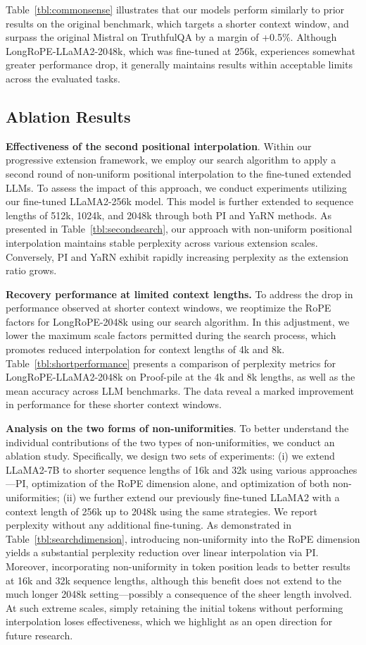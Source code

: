 Table~\ref{tbl:commonsense} illustrates that our models perform similarly to prior results on the original benchmark, which targets a shorter context window, and surpass the original Mistral on TruthfulQA by a margin of +0.5\%. Although LongRoPE-LLaMA2-2048k, which was fine-tuned at 256k, experiences somewhat greater performance drop, it generally maintains results within acceptable limits across the evaluated tasks.

\subsection{Ablation Results}

\textbf{Effectiveness of the second positional interpolation}. Within our progressive extension framework, we employ our search algorithm to apply a second round of non-uniform positional interpolation to the fine-tuned extended LLMs. To assess the impact of this approach, we conduct experiments utilizing our fine-tuned LLaMA2-256k model. This model is further extended to sequence lengths of 512k, 1024k, and 2048k through both PI and YaRN methods. As presented in Table~\ref{tbl:secondsearch}, our approach with non-uniform positional interpolation maintains stable perplexity across various extension scales. Conversely, PI and YaRN exhibit rapidly increasing perplexity as the extension ratio grows.

\textbf{Recovery performance at limited context lengths.} To address the drop in performance observed at shorter context windows, we reoptimize the RoPE factors for LongRoPE-2048k using our search algorithm. In this adjustment, we lower the maximum scale factors permitted during the search process, which promotes reduced interpolation for context lengths of 4k and 8k. Table~\ref{tbl:shortperformance} presents a comparison of perplexity metrics for LongRoPE-LLaMA2-2048k on Proof-pile at the 4k and 8k lengths, as well as the mean accuracy across LLM benchmarks. The data reveal a marked improvement in performance for these shorter context windows.

\textbf{Analysis on the two forms of non-uniformities}. To better understand the individual contributions of the two types of non-uniformities, we conduct an ablation study. Specifically, we design two sets of experiments: (i) we extend LLaMA2-7B to shorter sequence lengths of 16k and 32k using various approaches—PI, optimization of the RoPE dimension alone, and optimization of both non-uniformities; (ii) we further extend our previously fine-tuned LLaMA2 with a context length of 256k up to 2048k using the same strategies. We report perplexity without any additional fine-tuning. As demonstrated in Table~\ref{tbl:searchdimension}, introducing non-uniformity into the RoPE dimension yields a substantial perplexity reduction over linear interpolation via PI. Moreover, incorporating non-uniformity in token position leads to better results at 16k and 32k sequence lengths, although this benefit does not extend to the much longer 2048k setting—possibly a consequence of the sheer length involved. At such extreme scales, simply retaining the initial tokens without performing interpolation loses effectiveness, which we highlight as an open direction for future research.

